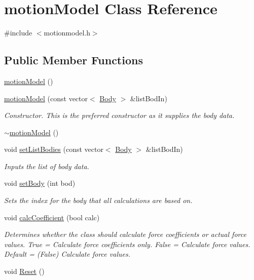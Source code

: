 \hypertarget{classmotion_model}{\section{motion\-Model Class Reference}
\label{classmotion_model}
}


{\ttfamily \#include $<$motionmodel.\-h$>$}

\subsection*{Public Member Functions}
\begin{DoxyCompactItemize}
\item 
\hyperlink{classmotion_model_a3053ac98ea42c3fe9de513bbdf93873c}{motion\-Model} ()
\item 
\hyperlink{classmotion_model_a94a2e5818b523b46faaf043e4d1664fb}{motion\-Model} (const vector$<$ \hyperlink{class_body}{Body} $>$ \&list\-Bod\-In)
\begin{DoxyCompactList}\small\item\em Constructor. This is the preferred constructor as it supplies the body data. \end{DoxyCompactList}\item 
\hyperlink{classmotion_model_a0d6c4bf5121bc6816e719df4a440814d}{$\sim$motion\-Model} ()
\item 
void \hyperlink{classmotion_model_a4d8ae1cf6fa5cb54a057306c627b5bf2}{set\-List\-Bodies} (const vector$<$ \hyperlink{class_body}{Body} $>$ \&list\-Bod\-In)
\begin{DoxyCompactList}\small\item\em Inputs the list of body data. \end{DoxyCompactList}\item 
void \hyperlink{classmotion_model_a9d76af6150fd935fc83080c972fc7cd0}{set\-Body} (int bod)
\begin{DoxyCompactList}\small\item\em Sets the index for the body that all calculations are based on. \end{DoxyCompactList}\item 
void \hyperlink{classmotion_model_a59d2d9f4c425492844921712fb5690cd}{calc\-Coefficient} (bool calc)
\begin{DoxyCompactList}\small\item\em Determines whether the class should calculate force coefficients or actual force values. True = Calculate force coefficients only. False = Calculate force values. Default = (False) Calculate force values. \end{DoxyCompactList}\item 
\hypertarget{classmotion_model_affba6d16fb4c63967d24edcb50967044}{void \hyperlink{classmotion_model_affba6d16fb4c63967d24edcb50967044}{Reset} ()}\label{classmotion_model_affba6d16fb4c63967d24edcb50967044}


\end{DoxyCompactItemize}
